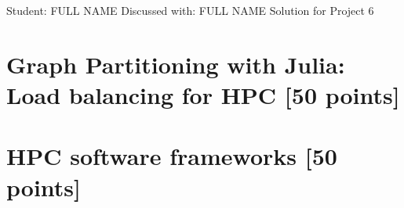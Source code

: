 \documentclass[unicode,10pt,a4paper,oneside,numbers=endperiod,openany]{scrartcl}
\begin{document}
\setassignment
{}

            {Student: FULL NAME}
            {Discussed with: FULL NAME}
            {Solution for Project 6}{}
\newline

\assignmentpolicy

\section{Graph Partitioning with Julia: Load balancing for HPC [50 points]}


\section{HPC software frameworks [50 points]}
\end{document}
